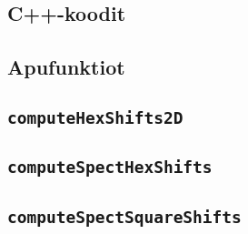 \begin{appendices}
\begin{landscape}
        \section{C++-koodit}\label{appendix:code}
        \subsection{Apufunktiot}\label{appendix:apufunktiot}
        \subsection{\texttt{computeHexShifts2D}}\label{appendix:2Dsiirto}
        \subsection{\texttt{computeSpectHexShifts}}\label{appendix:3Dsiirto}
        \subsection{\texttt{computeSpectSquareShifts}}\label{appendix:malli3}
    \end{landscape}
\end{appendices}